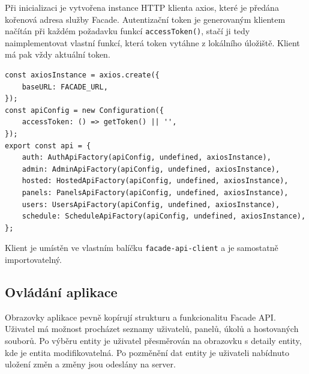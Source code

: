 Při inicializaci je vytvořena instance HTTP klienta axios\cite{AxiosAxios2024}, které je předána kořenová adresa služby Facade. Autentizační token je generovaným klientem načítán při každém požadavku funkcí \lstinline|accessToken()|, stačí ji tedy naimplementovat vlastní funkcí, která token vytáhne z lokálního úložiště. Klient má pak vždy aktuální token.

\begin{lstlisting}[label=src:facade-client-init,caption={Inicializace Facade API klienta}]
const axiosInstance = axios.create({
	baseURL: FACADE_URL,
});
const apiConfig = new Configuration({
	accessToken: () => getToken() || '',
});
export const api = {
	auth: AuthApiFactory(apiConfig, undefined, axiosInstance),
	admin: AdminApiFactory(apiConfig, undefined, axiosInstance),
	hosted: HostedApiFactory(apiConfig, undefined, axiosInstance),
	panels: PanelsApiFactory(apiConfig, undefined, axiosInstance),
	users: UsersApiFactory(apiConfig, undefined, axiosInstance),
	schedule: ScheduleApiFactory(apiConfig, undefined, axiosInstance),
};
\end{lstlisting}

Klient je umístěn ve vlastním balíčku \lstinline|facade-api-client| a je samostatně importovatelný.

\subsection{Ovládání aplikace}
Obrazovky aplikace pevně kopírují strukturu a funkcionalitu Facade API. Uživatel má možnost procházet seznamy uživatelů, panelů, úkolů a hostovaných souborů. Po výběru entity je uživatel přesměrován na obrazovku s detaily entity, kde je entita modifikovatelná. Po pozměnění dat entity je uživateli nabídnuto uložení změn a změny jsou odeslány na server.

